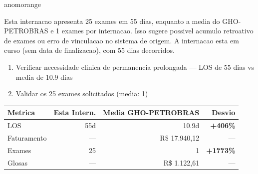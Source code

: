 \documentclass[a4paper,10pt]{article}
\begin{document}
\begin{anomalycard}[Internacao 163465 | GHO-PETROBRAS | ALTO (z=4.28)]{anomorange}
\vspace{2pt}\begin{tcolorbox}[colback=severityred!20,colframe=anomorange,title={\textbf{Interpretacao de Negocio}},fonttitle=\bfseries\small,left=4pt,right=4pt,top=3pt,bottom=3pt]
{\small Esta internacao apresenta 25 exames em 55 dias, enquanto a media do GHO-PETROBRAS e 1 exames por internacao. Isso sugere possivel acumulo retroativo de exames ou erro de vinculacao no sistema de origem. A internacao esta em curso (sem data de finalizacao), com 55 dias decorridos.}
\end{tcolorbox}
\begin{tcolorbox}[colback=severityyellow!30,colframe=anomorange,title={\textbf{Recomendacoes Especificas}},fonttitle=\bfseries\small,left=4pt,right=4pt,top=3pt,bottom=3pt]
\begin{enumerate}[nosep,leftmargin=16pt]
\item {\small Verificar necessidade clinica de permanencia prolongada --- LOS de 55 dias vs media de 10.9 dias}
\item {\small Validar os 25 exames solicitados (media: 1)}
\end{enumerate}
\end{tcolorbox}
\begin{center}\begin{tabular}{l r r r}\toprule\textbf{Metrica} & \textbf{Esta Intern.} & \textbf{Media GHO-PETROBRAS} & \textbf{Desvio} \\\midrule
LOS & 55d & 10.9d & \textcolor{anomred}{\textbf{+406\%}} \\
Faturamento & --- & R\$ 17.940,12 & --- \\
Exames & 25 & 1 & \textcolor{anomred}{\textbf{+1773\%}} \\
Glosas & --- & R\$ 1.122,61 & --- \\
\bottomrule\end{tabular}\end{center}


\end{anomalycard}
\end{document}
